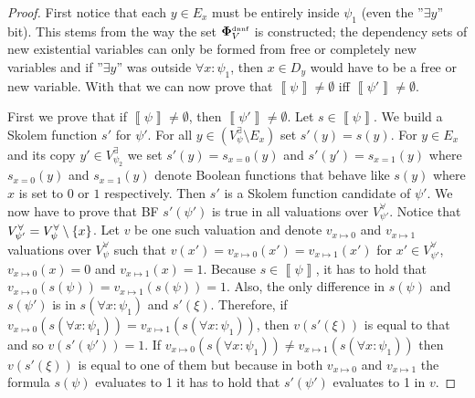 \documentclass[
  digital, %
  twoside, %
  table,   %
  nolof,     %
  nolot,     %
]{fithesis3}
\let\setbuilder\set
\newcommand{\simpleset}[1]{\{{#1}\}}
\renewcommand{\set}[1]{\normalexpandarg\IfSubStr{#1}{|}{\setbuilder{#1}}{\simpleset{#1}}}
\theoremstyle{definition}
\theoremstyle{remark}
\newcommand{\seman}[1]{\left\llbracket {#1} \right\rrbracket}
\newcommand{\DQBF}[1]{\mathbf{\Phi}_{#1}^{\text{\tiny dnnf}}}
\newcommand{\evars}[1]{V_{#1}^{\exists}}
\newcommand{\uvars}[1]{V_{#1}^{\forall}}
\begin{document}
\begin{proof}
  First notice that each $y \in E_x$ must be entirely inside $\psi_1$ (even the ''$\exists y$'' bit). This stems from the way the set $\DQBF{V}$ is constructed; the dependency sets of new existential variables can only be formed from free or completely new variables and if ''$\exists y$'' was outside $\forall x :\psi_1$, then $x \in D_y$ would have to be a free or new variable. With that we can now prove that $\seman{\psi} \not= \emptyset$ iff $\seman{\psi'} \not= \emptyset$.
  
  First we prove that if $\seman{\psi} \not= \emptyset$, then $\seman{\psi'} \not= \emptyset$. Let $s \in \seman{\psi}$. We build a Skolem function $s'$ for $\psi'$. For all $y \in (\evars{\psi} \setminus E_x)$ set $s'(y) = s(y)$. For $y \in E_x$ and its copy $y' \in \evars{\psi_2}$ we set $s'(y) = s_{x=0}(y)$ and $s'(y') = s_{x=1}(y)$ where $s_{x=0}(y)$ and $s_{x=1}(y)$ denote Boolean functions that behave like $s(y)$ where $x$ is set to $0$ or $1$ respectively. Then $s'$ is a Skolem function candidate of $\psi'$. We now have to prove that BF $s'(\psi')$ is true in all valuations over $\uvars{\psi'}$. Notice that $\uvars{\psi'} = \uvars{\psi} \setminus \set{x}$. Let $v$ be one such valuation and denote $v_{x\mapsto0}$ and $v_{x\mapsto1}$ valuations over $\uvars{\psi}$ such that $v(x') = v_{x\mapsto0}(x') = v_{x\mapsto1}(x')$ for $x' \in \uvars{\psi'}$, $v_{x\mapsto0}(x) = 0$ and $v_{x\mapsto1}(x) = 1$. Because $s \in \seman{\psi}$, it has to hold that $v_{x\mapsto0}(s(\psi)) = v_{x\mapsto1}(s(\psi)) = 1$. Also, the only difference in $s(\psi)$ and $s(\psi')$ is in $s(\forall x:\psi_1)$ and $s'(\xi)$. Therefore, if $v_{x\mapsto0}(s(\forall x:\psi_1)) = v_{x\mapsto1}(s(\forall x:\psi_1))$, then $v(s'(\xi))$ is equal to that and so $v(s'(\psi')) = 1$. If $v_{x\mapsto0}(s(\forall x:\psi_1)) \not= v_{x\mapsto1}(s(\forall x:\psi_1))$ then $v(s'(\xi))$ is equal to one of them but because in both $v_{x\mapsto0}$ and $v_{x\mapsto1}$ the formula $s(\psi)$ evaluates to 1 it has to hold that $s'(\psi')$ evaluates to 1 in $v$.
  

\end{proof}
\end{document}
